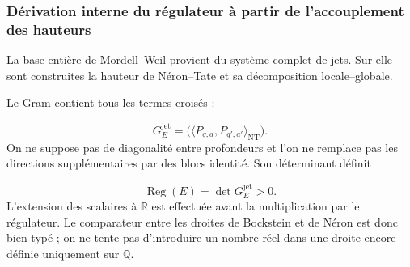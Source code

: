 \subsubsection{Dérivation interne du régulateur à partir de l’accouplement des hauteurs}
La base entière de Mordell–Weil provient du système complet de jets. Sur elle sont construites la hauteur de Néron–Tate et sa décomposition locale–globale.\par
Le Gram contient tous les termes croisés :\par
\[
G_E^{\mathrm{jet}}
=
\bigl(
\langle P_{q,a},P_{q',a'}\rangle_{\mathrm{NT}}
\bigr).
\]
On ne suppose pas de diagonalité entre profondeurs et l’on ne remplace pas les directions supplémentaires par des blocs identité. Son déterminant définit\par
\[
\operatorname{Reg}(E)
=
\det G_E^{\mathrm{jet}}
>0.
\]
L’extension des scalaires à \(\mathbb R\) est effectuée avant la multiplication par le régulateur. Le comparateur entre les droites de Bockstein et de Néron est donc bien typé ; on ne tente pas d’introduire un nombre réel dans une droite encore définie uniquement sur \(\mathbb Q\).\par
{}
